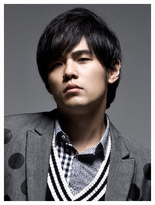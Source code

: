 \documentclass[a4paper,12pt,final]{memoir}
\begin{document}
\begin{figure}
	\hfill
	\includegraphics[width=0.8\columnwidth]{photo}
	\vspace{-7cm}
\end{figure}
\end{document}
